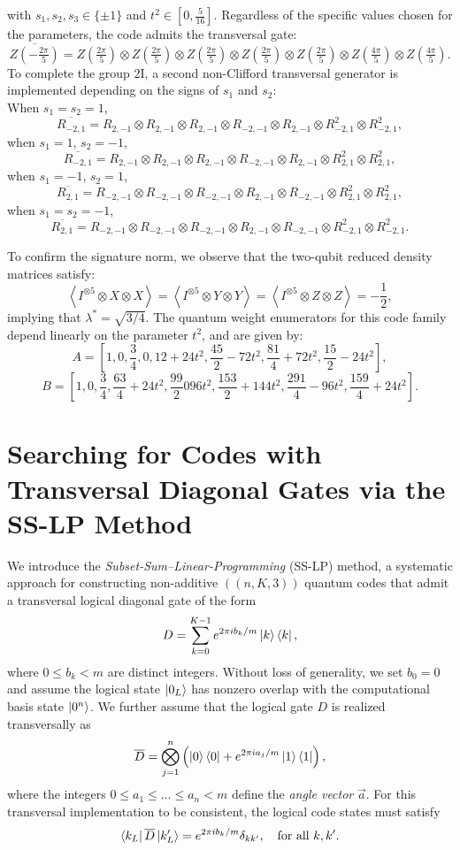 \documentclass[8pt]{article}
\theoremstyle{definition}
\begin{document}
with \(s_1, s_2, s_3 \in \{\pm 1\}\) and \(t^2 \in [0, \tfrac{5}{16}]\). Regardless of the specific values chosen for the parameters, the code admits the transversal gate:
\[ \overline{Z\left(-\tfrac{2\pi}{5}\right)}=Z\left(\tfrac{2\pi}{5}\right)\otimes Z\left(\tfrac{2\pi}{5}\right)\otimes Z\left(\tfrac{2\pi}{5}\right)\otimes Z\left(\tfrac{2\pi}{5}\right)\otimes Z\left(\tfrac{2\pi}{5}\right)\otimes Z\left(\tfrac{4\pi}{5}\right)\otimes Z\left(\tfrac{4\pi}{5}\right).\]
To complete the group \(2\mathrm{I}\), a second non-Clifford transversal generator is implemented depending on the signs of \(s_1\) and \(s_2\):\\
When \(s_1 = s_2 = 1\),
\[ \overline{R_{-2,1}}=R_{2,-1}\otimes R_{2,-1}\otimes R_{2,-1}\otimes R_{-2,-1}\otimes R_{2,-1}\otimes R_{-2,1}^{2}\otimes R_{-2,1}^{2}, \]
when \(s_1 = 1\), \(s_2 = -1\),
\[ \overline{R_{-2,1}}=R_{2,-1}\otimes R_{2,-1}\otimes R_{2,-1}\otimes R_{-2,-1}\otimes R_{2,-1}\otimes R_{2,1}^{2}\otimes R_{2,1}^{2}, \]
when \(s_1 = -1\), \(s_2 = 1\),
\[ \overline{R_{2,1}}=R_{-2,-1}\otimes R_{-2,-1}\otimes R_{-2,-1}\otimes R_{2,-1}\otimes R_{-2,-1}\otimes R_{2,1}^{2}\otimes R_{2,1}^{2}, \]
when \(s_1 = s_2 = -1\),
\[ \overline{R_{2,1}}=R_{-2,-1}\otimes R_{-2,-1}\otimes R_{-2,-1}\otimes R_{2,-1}\otimes R_{-2,-1}\otimes R_{-2,1}^{2}\otimes R_{-2,1}^{2}. \]

To confirm the signature norm, we observe that the two-qubit reduced density matrices satisfy:
\[ \left\langle I^{\otimes 5}\otimes X\otimes X\right\rangle =\left\langle I^{\otimes 5}\otimes Y\otimes Y\right\rangle =\left\langle I^{\otimes 5}\otimes Z\otimes Z\right\rangle =-\frac{1}{2}, \]
implying that \(\lambda^* = \sqrt{3/4}\). The quantum weight enumerators for this code family depend linearly on the parameter \(t^2\), and are given by:
\[ A=\left[1,0,\frac{3}{4},0,12+24t^{2},\frac{45}{2}-72t^{2},\frac{81}{4}+72t^{2},\frac{15}{2}-24t^{2}\right], \]
\[ B=\left[1,0,\frac{3}{4},\frac{63}{4}+24t^{2},\frac{99}{2}096t^{2},\frac{153}{2}+144t^{2},\frac{291}{4}-96t^{2},\frac{159}{4}+24t^{2}\right]. \]

\section{Searching for Codes with Transversal Diagonal Gates via the SS-LP Method}

We introduce the \emph{Subset-Sum–Linear-Programming} (SS-LP) method, a systematic approach for constructing non-additive $((n,K,3))$ quantum codes that admit a transversal logical diagonal gate of the form
\[
    D = \sum_{k=0}^{K-1} e^{2\pi i b_k/m}\ket{k}\bra{k},
\]
where $0 \le b_k < m$ are distinct integers. Without loss of generality, we set $b_0 = 0$ and assume the logical state $\ket{0_L}$ has nonzero overlap with the computational basis state $\ket{0^n}$.
We further assume that the logical gate $D$ is realized transversally as
\[
    \overline{D} = \bigotimes_{j=1}^n \left(\ket{0}\bra{0} + e^{2\pi i a_j/m}\ket{1}\bra{1}\right),
\]
where the integers $0 \le a_1 \le \dots \le a_n < m$ define the \emph{angle vector} $\vec{a}$. For this transversal implementation to be consistent, the logical code states must satisfy
\[
    \bra{k_L}\overline{D}\ket{k'_L} = e^{2\pi i b_k/m}\delta_{kk'}, \quad\text{for all } k,k'.
\]
\end{document}
